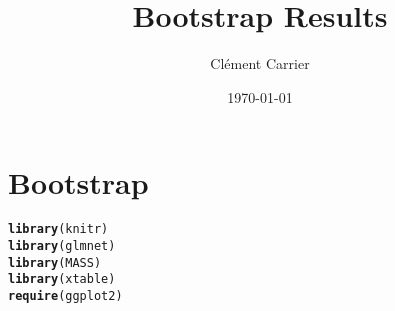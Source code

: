 \documentclass[11pt,oneside, a4paper]{amsart}\usepackage[]{graphicx}\usepackage[]{color}
\makeatletter
\newcommand{\hlstd}[1]{\textcolor[rgb]{0.345,0.345,0.345}{#1}}%
\newcommand{\hlkwd}[1]{\textcolor[rgb]{0.737,0.353,0.396}{\textbf{#1}}}%
\newenvironment{kframe}{%
 \def\at@end@of@kframe{}%
 \ifinner\ifhmode%
  \def\at@end@of@kframe{\end{minipage}}%
  \begin{minipage}{\columnwidth}%
 \fi\fi%
 \def\FrameCommand##1{\hskip\@totalleftmargin \hskip-\fboxsep
 \colorbox{shadecolor}{##1}\hskip-\fboxsep
     \hskip-\linewidth \hskip-\@totalleftmargin \hskip\columnwidth}%
 \MakeFramed {\advance\hsize-\width
   \@totalleftmargin\z@ \linewidth\hsize
   \@setminipage}}%
 {\par\unskip\endMakeFramed%
 \at@end@of@kframe}
\newenvironment{knitrout}{}{} %
\makeatother
\begin{document}
  
\title{Bootstrap Results}   
\author{Clément Carrier}
\date{\today}
\maketitle


\section*{Bootstrap}


\begin{knitrout}
\color{fgcolor}\begin{kframe}
\begin{alltt}
\hlkwd{library}\hlstd{(knitr)}
\hlkwd{library}\hlstd{(glmnet)}
\hlkwd{library}\hlstd{(MASS)}
\hlkwd{library}\hlstd{(xtable)}
\hlkwd{require}\hlstd{(ggplot2)}
\end{alltt}
\end{kframe}
\end{knitrout}
\end{document}
